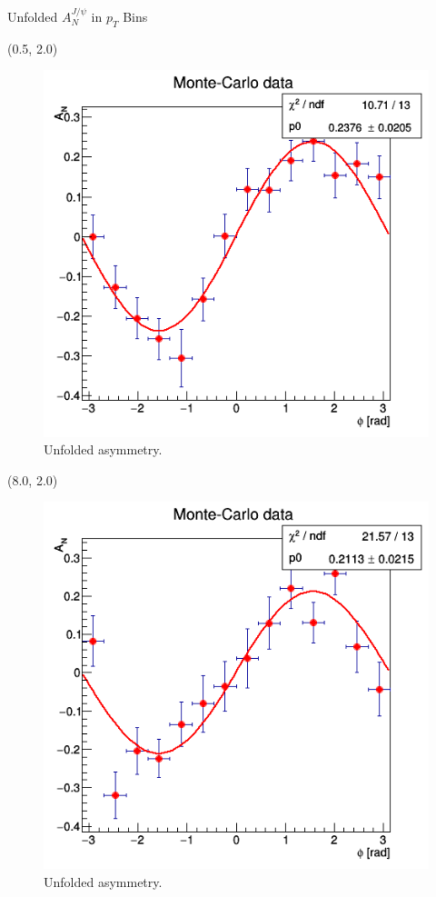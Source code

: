 \documentclass[10pt, xcolor={dvipsnames}, aspectratio = 169]{beamer}
\begin{document}
\begin{frame}{Unfolded $A^{J/\psi}_{N}$ in $p_{T}$ Bins}

\begin{textblock}{7.0}(0.5, 2.0)
\begin{figure}
    \centering
    \includegraphics[width = 1.0\linewidth]{imgs/sigal_asym0.png}
    \caption{Unfolded asymmetry.}
\end{figure}
\end{textblock}

\begin{textblock}{7.0}(8.0, 2.0)
\begin{figure}
    \centering
    \includegraphics[width = 1.0\linewidth]{imgs/sigal_asym1.png}
    \caption{Unfolded asymmetry.}
\end{figure}
\end{textblock}


\end{frame}
\end{document}
